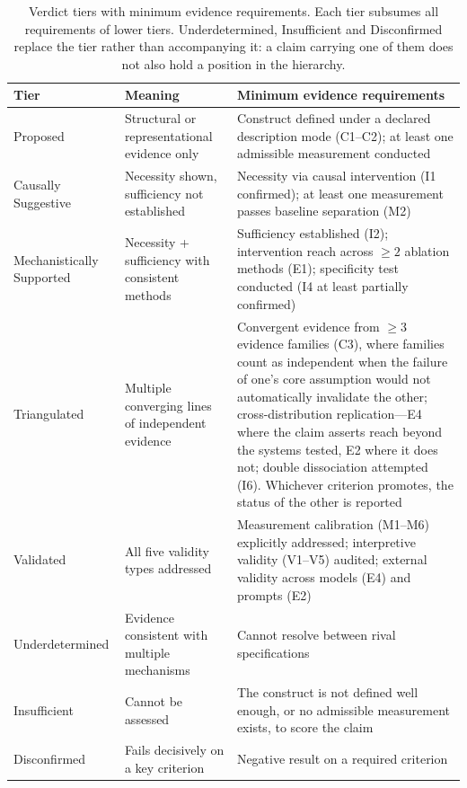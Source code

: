 \documentclass{article}
\begin{document}
\begin{table}[H]
\centering
\small
\caption{Verdict tiers with minimum evidence requirements. Each tier subsumes all requirements of lower tiers. Underdetermined, Insufficient and Disconfirmed replace the tier rather than accompanying it: a claim carrying one of them does not also hold a position in the hierarchy.}
\label{tab:verdicts}
\label{tab:tier-promotion}
\renewcommand{\arraystretch}{1.15}
\begin{tabular}{@{}>{\raggedright\arraybackslash}p{2.2cm}>{\raggedright\arraybackslash}p{3.4cm}>{\raggedright\arraybackslash}p{7.0cm}@{}}
\toprule
\textbf{Tier} & \textbf{Meaning} & \textbf{Minimum evidence requirements} \\
\midrule
Proposed & Structural or representational evidence only & Construct defined under a declared description mode (C1--C2); at least one admissible measurement conducted \\
\midrule
Causally Suggestive & Necessity shown, sufficiency not established & Necessity via causal intervention (I1 confirmed); at least one measurement passes baseline separation (M2) \\
\midrule
Mechanistically Supported & Necessity + sufficiency with consistent methods & Sufficiency established (I2); intervention reach across $\geq 2$ ablation methods (E1); specificity test conducted (I4 at least partially confirmed) \\
\midrule
Triangulated & Multiple converging lines of independent evidence & Convergent evidence from $\geq 3$ evidence families (C3), where families count as independent when the failure of one's core assumption would not automatically invalidate the other; cross-distribution replication---E4 where the claim asserts reach beyond the systems tested, E2 where it does not; double dissociation attempted (I6). Whichever criterion promotes, the status of the other is reported \\
\midrule
Validated & All five validity types addressed & Measurement calibration (M1--M6) explicitly addressed; interpretive validity (V1--V5) audited; external validity across models (E4) and prompts (E2) \\
\midrule
Underdetermined & Evidence consistent with multiple mechanisms & Cannot resolve between rival specifications \\
\midrule
Insufficient & Cannot be assessed & The construct is not defined well enough, or no admissible measurement exists, to score the claim \\
\midrule
Disconfirmed & Fails decisively on a key criterion & Negative result on a required criterion \\
\bottomrule
\end{tabular}
\end{table}
\end{document}
